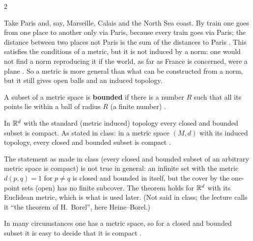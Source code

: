\begin{paracol}{2}
\begin{example}\label{ex:iv-sncf}
Take Paris and, say, Marseille, Calais and the North Sea coast. By train one goes from one place to another only via Paris, because every train goes via
Paris; the distance between two places not Paris is the sum of the distances to Paris . This satisfies the conditions of
a metric, but it is not induced by a norm: one would not find a norm reproducing it if the world, as far as France is concerned, were a plane
. So a metric is more general than what can be constructed from a norm, but it still gives open balls and an
induced topology.
\end{example}
\begin{definition}
A subset of a metric space is \textbf{bounded} if there is a number $R$ such that all its points lie within a ball of radius $R$ (a finite number)
.
\end{definition}

\begin{theorem}\label{thm:iv-HB}
In $\mathbb{R}^d$ with the standard (metric induced) topology every closed and bounded subset is compact. As stated in class: in a metric space $(M,d)$ with its
induced topology, every closed and bounded subset is compact .
\end{theorem}
\begin{coursenote}
The statement as made in class (every closed and bounded subset of an arbitrary metric space is compact) is not true in general: an infinite set with
the metric $d(p,q)=1$ for $p\ne q$ is closed and bounded in itself, but the cover by the one-point sets (open) has no finite subcover. The theorem holds for
$\mathbb{R}^d$ with its Euclidean metric, which is what is used later. (Not said in class; the lecture calls it ``the theorem of H.\ Borel'', here Heine--Borel.)
\end{coursenote}
In many circumstances one has a metric space, so for a closed and bounded subset it is easy to decide that it is compact .


\end{paracol}
